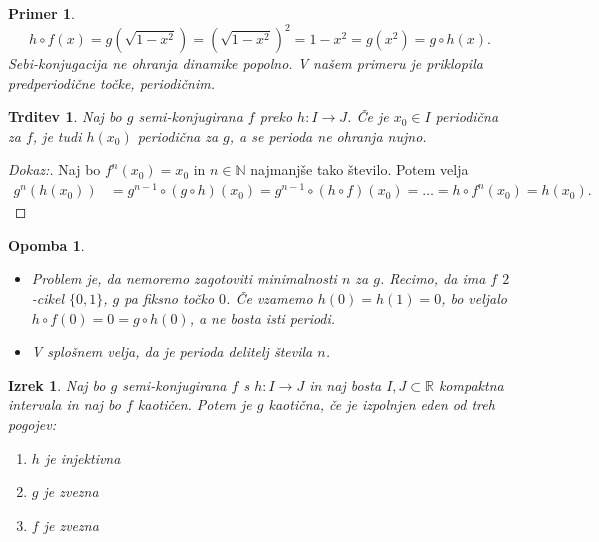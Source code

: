 \documentclass{article}
\newtheorem{trditev}{Trditev}
\newtheorem{opomba}{Opomba}
\newtheorem{primer}{Primer}
\newtheorem{izrek}{Izrek}
\newcommand{\N}{\mathbb{N}}
\newcommand{\R}{\mathbb{R}}
\begin{document}
\begin{primer}
$$
h\circ f(x) = g(\sqrt{1 - x^2}) = (\sqrt{1 - x^2})^2 = 1 - x^2 = g(x^2) = g\circ h(x).
$$
Sebi-konjugacija ne ohranja dinamike popolno. V našem primeru je priklopila predperiodične točke, periodičnim.
\end{primer}

\begin{trditev}
Naj bo $g$ semi-konjugirana $f$ preko $h:I \rightarrow J$. Če je $x_0 \in I$ periodična za $f$, je tudi $h(x_0)$ periodična za $g$, a se perioda ne ohranja nujno.
\end{trditev}

\begin{proof}[Dokaz:]
Naj bo $f^n(x_0) = x_0$ in $n\in \N$ najmanjše tako število. Potem velja
\begin{align*}
g^n(h(x_0)) &= g^{n-1}\circ (g\circ h)(x_0) = g^{n-1}\circ (h\circ f)(x_0) = 
\dots = h\circ f^n(x_0) = h(x_0).
\end{align*}
\end{proof}

\begin{opomba}
\hfill
\begin{itemize}
\item Problem je, da nemoremo zagotoviti minimalnosti $n$ za $g$. Recimo, da ima 
$f$ $2$-cikel $\{0, 1\}$, $g$ pa fiksno točko $0$. Če vzamemo $h(0) = h(1) = 0$, bo 
veljalo $h\circ f(0) = 0 = g\circ h(0)$, a ne bosta isti periodi.
\item V splošnem velja, da je perioda delitelj števila $n$.
\end{itemize}
\end{opomba}

\begin{izrek}
Naj bo $g$ semi-konjugirana $f$ s $h: I \rightarrow J$ in naj bosta $I, J \subset \R$ kompaktna intervala in naj bo $f$ kaotičen. Potem je $g$ kaotična, če je izpolnjen eden od treh pogojev:
\begin{enumerate}
\item[i)] $h$ je injektivna
\item[ii)] $g$ je zvezna
\item[iii)] $f$ je zvezna
\end{enumerate}
\end{izrek}
\end{document}
